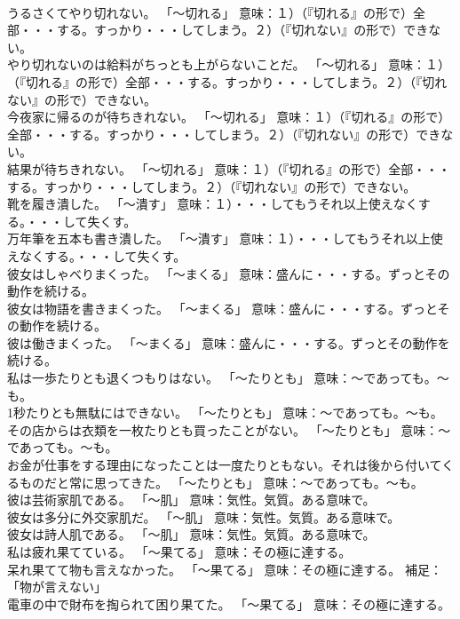 \documentclass[8pt]{extreport}
\begin{document}
\begin{CJK}{UTF8}{min}
\\	うるさくてやり切れない。	「～切れる」 意味：１）（『切れる』の形で）全部・・・する。すっかり・・・してしまう。２）（『切れない』の形で）できない。	
\\	やり切れないのは給料がちっとも上がらないことだ。	「～切れる」 意味：１）（『切れる』の形で）全部・・・する。すっかり・・・してしまう。２）（『切れない』の形で）できない。	
\\	今夜家に帰るのが待ちきれない。	「～切れる」 意味：１）（『切れる』の形で）全部・・・する。すっかり・・・してしまう。２）（『切れない』の形で）できない。	
\\	結果が待ちきれない。	「～切れる」 意味：１）（『切れる』の形で）全部・・・する。すっかり・・・してしまう。２）（『切れない』の形で）できない。	
\\	靴を履き潰した。	「～潰す」 意味：１）・・・してもうそれ以上使えなくする。・・・して失くす。	
\\	万年筆を五本も書き潰した。	「～潰す」 意味：１）・・・してもうそれ以上使えなくする。・・・して失くす。	
\\	彼女はしゃべりまくった。	「～まくる」 意味：盛んに・・・する。ずっとその動作を続ける。	
\\	彼女は物語を書きまくった。	「～まくる」 意味：盛んに・・・する。ずっとその動作を続ける。	
\\	彼は働きまくった。	「～まくる」 意味：盛んに・・・する。ずっとその動作を続ける。	
\\	私は一歩たりとも退くつもりはない。	「～たりとも」 意味：～であっても。～も。	
\\	1秒たりとも無駄にはできない。	「～たりとも」 意味：～であっても。～も。	
\\	その店からは衣類を一枚たりとも買ったことがない。	「～たりとも」 意味：～であっても。～も。	
\\	お金が仕事をする理由になったことは一度たりともない。それは後から付いてくるものだと常に思ってきた。	「～たりとも」 意味：～であっても。～も。	
\\	彼は芸術家肌である。	「～肌」 意味：気性。気質。ある意味で。	
\\	彼女は多分に外交家肌だ。	「～肌」 意味：気性。気質。ある意味で。	
\\	彼女は詩人肌である。	「～肌」 意味：気性。気質。ある意味で。	
\\	私は疲れ果てている。	「～果てる」 意味：その極に達する。	
\\	呆れ果てて物も言えなかった。	「～果てる」 意味：その極に達する。 補足：「物が言えない」
\\	電車の中で財布を掏られて困り果てた。	「～果てる」 意味：その極に達する。	

\end{CJK}
\end{document}
